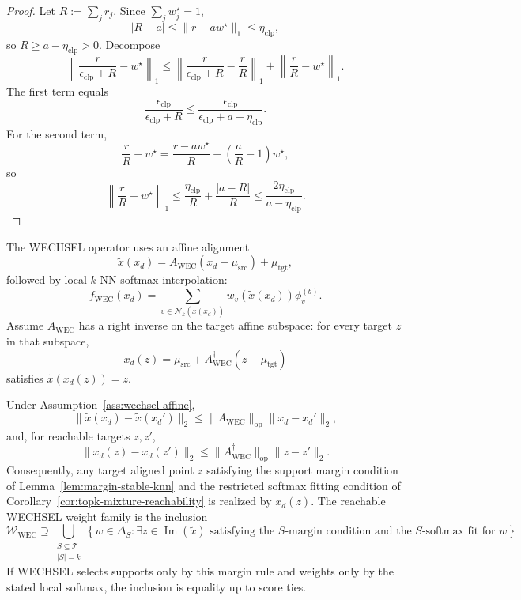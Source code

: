 \begin{proof}
Let $R:=\sum_j r_j$. Since $\sum_j w_j^\star=1$,
\[
|R-a|\le \|r-aw^\star\|_1\le \eta_{\mathrm{clp}},
\]
so $R\ge a-\eta_{\mathrm{clp}}>0$. Decompose
\[
\left\|\frac{r}{\epsilon_{\mathrm{clp}}+R}-w^\star\right\|_1
\le
\left\|\frac{r}{\epsilon_{\mathrm{clp}}+R}-\frac{r}{R}\right\|_1
+
\left\|\frac{r}{R}-w^\star\right\|_1.
\]
The first term equals
\[
\frac{\epsilon_{\mathrm{clp}}}{\epsilon_{\mathrm{clp}}+R}
\le
\frac{\epsilon_{\mathrm{clp}}}{\epsilon_{\mathrm{clp}}+a-\eta_{\mathrm{clp}}}.
\]
For the second term,
\[
\frac{r}{R}-w^\star
=
\frac{r-aw^\star}{R}+
\left(\frac{a}{R}-1\right)w^\star,
\]
so
\[
\left\|\frac{r}{R}-w^\star\right\|_1
\le
\frac{\eta_{\mathrm{clp}}}{R}+\frac{|a-R|}{R}
\le
\frac{2\eta_{\mathrm{clp}}}{a-\eta_{\mathrm{clp}}}.
\]
\end{proof}

\begin{assumption}
\label{ass:wechsel-affine}
The WECHSEL operator uses an affine alignment
\[
\widetilde{x}(x_d)=A_{\mathrm{WEC}}(x_d-\mu_{\mathrm{src}})+\mu_{\mathrm{tgt}},
\]
followed by local $k$-NN softmax interpolation:
\[
f_{\mathrm{WEC}}(x_d)=
\sum_{v\in\mathcal{N}_k(\widetilde{x}(x_d))}
w_v(\widetilde{x}(x_d))\phi_v^{(b)}.
\]
Assume $A_{\mathrm{WEC}}$ has a right inverse on the target affine subspace: for every target $z$ in that subspace,
\[
x_d(z)=\mu_{\mathrm{src}}+A_{\mathrm{WEC}}^\dagger(z-\mu_{\mathrm{tgt}})
\]
satisfies $\widetilde{x}(x_d(z))=z$.
\end{assumption}

\begin{lemma}
\label{lem:wechsel-reachability}
Under Assumption~\ref{ass:wechsel-affine},
\[
\|\widetilde{x}(x_d)-\widetilde{x}(x_d')\|_2
\le
\|A_{\mathrm{WEC}}\|_{\mathrm{op}}\|x_d-x_d'\|_2,
\]
and, for reachable targets $z,z'$,
\[
\|x_d(z)-x_d(z')\|_2
\le
\|A_{\mathrm{WEC}}^\dagger\|_{\mathrm{op}}\|z-z'\|_2.
\]
Consequently, any target aligned point $z$ satisfying the support margin condition of Lemma~\ref{lem:margin-stable-knn} and the restricted softmax fitting condition of Corollary~\ref{cor:topk-mixture-reachability} is realized by $x_d(z)$. The reachable WECHSEL weight family is the inclusion
\[
\mathcal{W}_{\mathrm{WEC}}
\supseteq
\bigcup_{\substack{S\subseteq\mathcal{T}\\ |S|=k}}
\left\{
 w\in\Delta_S:
 \exists z\in\operatorname{Im}(\widetilde{x})\text{ satisfying the }S\text{-margin condition and the }S\text{-softmax fit for }w
\right\}.
\]
If WECHSEL selects supports only by this margin rule and weights only by the stated local softmax, the inclusion is equality up to score ties.
\end{lemma}

